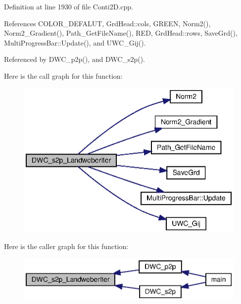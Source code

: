 Definition at line 1930 of file Conti2\+D.\+cpp.



References C\+O\+L\+O\+R\+\_\+\+D\+E\+F\+A\+L\+UT, Grd\+Head\+::cols, G\+R\+E\+EN, Norm2(), Norm2\+\_\+\+Gradient(), Path\+\_\+\+Get\+File\+Name(), R\+ED, Grd\+Head\+::rows, Save\+Grd(), Multi\+Progress\+Bar\+::\+Update(), and U\+W\+C\+\_\+\+Gij().



Referenced by D\+W\+C\+\_\+p2p(), and D\+W\+C\+\_\+s2p().

Here is the call graph for this function\+:
\nopagebreak
\begin{figure}[H]
\begin{center}
\leavevmode
\includegraphics[width=342pt]{Conti2D_8h_a30671331e25e6cfa739e77aec57b7f18_a30671331e25e6cfa739e77aec57b7f18_cgraph}
\end{center}
\end{figure}
Here is the caller graph for this function\+:\nopagebreak
\begin{figure}[H]
\begin{center}
\leavevmode
\includegraphics[width=347pt]{Conti2D_8h_a30671331e25e6cfa739e77aec57b7f18_a30671331e25e6cfa739e77aec57b7f18_icgraph}
\end{center}
\end{figure}
\mbox{\label{Conti2D_8h_a08f63b90a388692c22c4799d19a80207_a08f63b90a388692c22c4799d19a80207}} 
